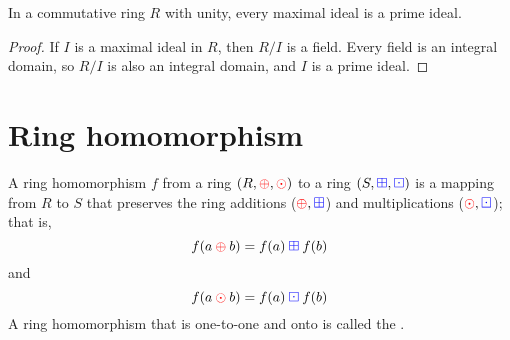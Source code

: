 \begin{corollary}
    In a commutative ring $R$ with unity, every maximal ideal is a prime ideal.
\end{corollary}
\begin{proof}
    If $I$ is a maximal ideal in $R$, then $R/I$ is a field. Every field is an integral domain, so $R/I$ is 
    also an integral domain, and $I$ is a prime ideal.
\end{proof}

\section{Ring homomorphism}

\begin{definition}
    A ring homomorphism $f$ from a ring $(R, {\color{red} \oplus}, {\color{red} \odot})$ to a ring 
    $(S, {\color{blue} \boxplus}, {\color{blue} \boxdot})$ is a mapping from $R$ to $S$ that preserves the 
    ring additions (${\color{red} \oplus}, {\color{blue} \boxplus}$) and multiplications (${\color{red} \odot}, {\color{blue} \boxdot}$); that is, 
    \begin{equation*}
        f(a \> {\color{red} \oplus} \> b) = f(a) \> {\color{blue} \boxplus} \> f(b) 
    \end{equation*}
    and 
    \begin{equation*}
        f(a \> {\color{red} \odot} \> b) = f(a) \> {\color{blue} \boxdot} \> f(b) 
    \end{equation*}
    A ring homomorphism that is one-to-one and onto is called the .
\end{definition}

